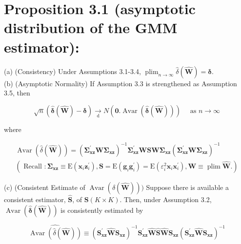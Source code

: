 \documentclass[10pt]{article}
\begin{document}
\section*{Proposition 3.1 (asymptotic distribution of the GMM estimator):}
(a) (Consistency) Under Assumptions 3.1-3.4, $\operatorname{plim}_{n \rightarrow \infty} \hat{\delta}(\widehat{\mathbf{W}})=\boldsymbol{\delta}$.\\
(b) (Asymptotic Normality) If Assumption 3.3 is strengthened as Assumption 3.5, then

$$
\sqrt{n}(\hat{\boldsymbol{\delta}}(\widehat{\mathbf{W}})-\boldsymbol{\delta}) \underset{\mathrm{d}}{\rightarrow} N(\mathbf{0} . \operatorname{Avar}(\hat{\boldsymbol{\delta}}(\widehat{\mathbf{W}}))) \quad \text { as } n \rightarrow \infty
$$

where

\[
\begin{array}{r}
\operatorname{Avar}(\hat{\delta}(\widehat{\mathbf{W}}))=\left(\boldsymbol{\Sigma}_{\mathbf{x z}}^{\prime} \mathbf{W} \boldsymbol{\Sigma}_{\mathbf{x z}}\right)^{-1} \boldsymbol{\Sigma}_{\mathbf{x z}}^{\prime} \mathbf{W S W} \boldsymbol{\Sigma}_{\mathbf{x z}}\left(\boldsymbol{\Sigma}_{\mathbf{x z}}^{\prime} \mathbf{W} \boldsymbol{\Sigma}_{\mathbf{x z}}\right)^{-1}  \tag{3.5.1}\\
\left(\text { Recall }: \boldsymbol{\Sigma}_{\mathbf{x z}} \equiv \mathrm{E}\left(\mathbf{x}_{i} \mathbf{z}_{i}^{\prime}\right), \mathbf{S}=\mathrm{E}\left(\mathbf{g}_{i} \mathbf{g}_{i}^{\prime}\right)=\mathrm{E}\left(\varepsilon_{i}^{2} \mathbf{x}_{i} \mathbf{x}_{i}^{\prime}\right), \mathbf{W} \equiv \operatorname{plim} \widehat{\mathbf{W}} .\right)
\end{array}
\]

(c) (Consistent Estimate of $\operatorname{Avar}(\hat{\delta}(\widehat{\mathbf{W}})))$ Suppose there is available a consistent estimator, $\widehat{\mathbf{S}}$, of $\mathbf{S}(K \times K)$. Then, under Assumption 3.2, $\operatorname{Avar}(\hat{\boldsymbol{\delta}}(\widehat{\mathbf{W}}))$ is consistently estimated by


\begin{equation*}
\widehat{\operatorname{Avar}(\hat{\delta}(\widehat{\mathbf{W}}))} \equiv\left(\mathbf{S}_{\mathbf{x z}}^{\prime} \widehat{\mathbf{W}} \mathbf{S}_{\mathbf{x z}}\right)^{-1} \mathbf{S}_{\mathbf{x z}}^{\prime} \widehat{\mathbf{W}} \widehat{\mathbf{S}} \widehat{\mathbf{W}} \mathbf{S}_{\mathbf{x z}}\left(\mathbf{S}_{\mathbf{x z}}^{\prime} \widehat{\mathbf{W}} \mathbf{S}_{\mathbf{x z}}\right)^{-1} \tag{3.5.2}
\end{equation*}
\end{document}
